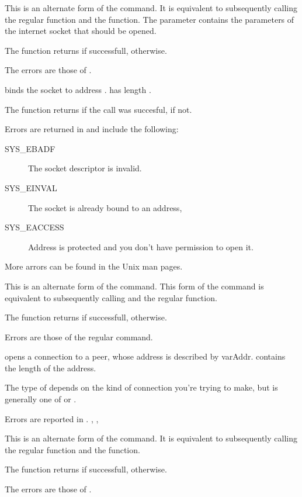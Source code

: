 { This is an alternate form of the  command. 
It is equivalent
to subsequently calling the regular  function and the 
 function.
The  parameter contains the parameters of the internet socket that
should be opened.

The function returns  if successfull,  otherwise.
}
{The errors are those of .}
{}

{ binds the socket  to address . 
has length .

The function returns  if the call was succesful,  if
not.
}
{Errors are returned in  and include the following:
\begin{description}
\item[SYS\_EBADF] The socket descriptor is invalid.
\item[SYS\_EINVAL] The socket is already bound to an address,
\item[SYS\_EACCESS] Address is protected and you don't have permission to
open it.
\end{description}
More arrors can be found in the Unix man pages.
}{}

{This is an alternate form of the  command.
This form of the  command is equivalent to subsequently 
calling  and the regular  function.

The function returns  if successfull,  otherwise.
}
{Errors are those of the regular  command.}
{}

{ opens a connection to a peer, whose address is described by
var{Addr}.  contains the length of the address.

The type of  depends on the kind of connection you're trying to
make, but is generally one of  or .
}
{Errors are reported in .}
{, ,}



{ This is an alternate form of the  command. 
It is equivalent
to subsequently calling the regular  function and the 
 function.

The function returns  if successfull,  otherwise.
}{The errors are those of .}
{}

